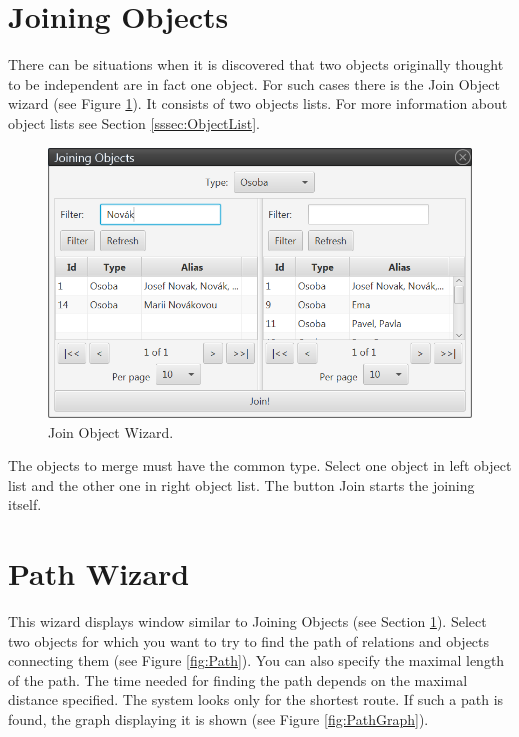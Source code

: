 \section{Joining Objects}
\label{ssec:JoinObjects}

There can be situations when it is discovered that two objects originally
thought to be independent are in fact one object. For such cases there is the Join
Object wizard (see Figure \ref{fig:Join}). It consists of two objects lists. For
more information about object lists see Section \ref{sssec:ObjectList}.

\begin{figure}[!htb]
        \centering
        \includegraphics[width=\textwidth]{Images/join}
        \caption{Join Object Wizard.}
        \label{fig:Join}
\end{figure}

The objects to merge must have the common type. Select one object in left object
list and the other one in right object list. The button Join starts the joining
itself.

\section{Path Wizard}
\label{ssec:PathWizard}

This wizard displays window similar to Joining Objects (see Section
\ref{ssec:JoinObjects}). Select two objects for which you want to try to find
the path of relations and objects connecting them (see Figure \ref{fig:Path}).
You can also specify the maximal length of the path. The time needed for finding
the path depends on the maximal distance specified. The system looks only for
the shortest route. If such a path is found, the graph displaying it is shown (see
Figure \ref{fig:PathGraph}).

